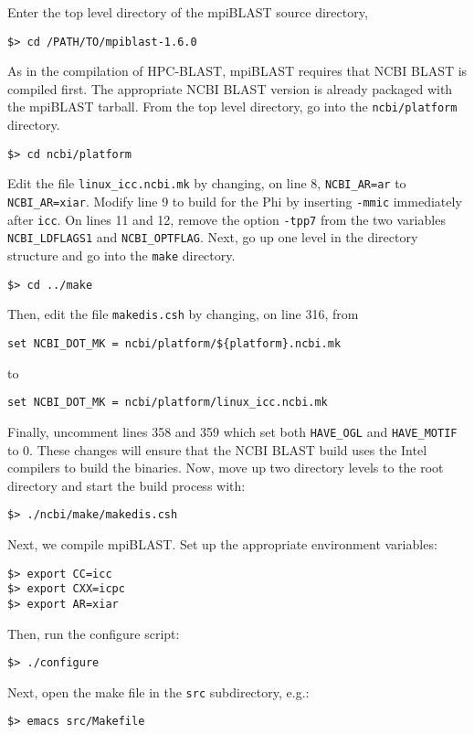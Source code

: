 \documentclass[10pt]{article}
\begin{document}
\noindent Enter the top level directory of the mpiBLAST source directory,
\begin{verbatim}
$> cd /PATH/TO/mpiblast-1.6.0
\end{verbatim}
\noindent As in the compilation of HPC-BLAST, mpiBLAST requires that NCBI BLAST is compiled first.  The appropriate NCBI BLAST version is already packaged with the mpiBLAST tarball.
From the top level directory, go into the \verb^ncbi/platform^ directory.
\begin{verbatim}
$> cd ncbi/platform
\end{verbatim}
\noindent Edit the file \verb^linux_icc.ncbi.mk^ by changing, on line 8, \verb^NCBI_AR=ar^ to \verb^NCBI_AR=xiar^.  Modify line 9 to build
for the Phi by inserting \verb^-mmic^ immediately after \verb^icc^.  On lines 11 and 12, remove the option \verb^-tpp7^ from the two variables
\verb^NCBI_LDFLAGS1^ and \verb^NCBI_OPTFLAG^.  Next, go up one level in the directory structure and go into the \verb^make^ directory.
\begin{verbatim}
$> cd ../make
\end{verbatim}
\noindent Then, edit the file \verb^makedis.csh^ by changing, on line 316, from
\begin{verbatim}
set NCBI_DOT_MK = ncbi/platform/${platform}.ncbi.mk
\end{verbatim}
\noindent to
\begin{verbatim}
set NCBI_DOT_MK = ncbi/platform/linux_icc.ncbi.mk
\end{verbatim}
\noindent Finally, uncomment lines 358 and 359 which set both \verb^HAVE_OGL^ and \verb^HAVE_MOTIF^ to 0.
These changes will ensure that the NCBI BLAST build uses the Intel compilers to build the binaries.  Now, move up two directory levels to the root directory and start the build process with:
\begin{verbatim}
$> ./ncbi/make/makedis.csh
\end{verbatim}
\noindent Next, we compile mpiBLAST.  Set up the appropriate environment variables:
\begin{verbatim}
$> export CC=icc
$> export CXX=icpc
$> export AR=xiar
\end{verbatim}
\noindent Then, run the configure script:
\begin{verbatim}
$> ./configure
\end{verbatim}
\noindent Next, open the make file in the \verb^src^ subdirectory, e.g.:
\begin{verbatim}
$> emacs src/Makefile
\end{verbatim}
\end{document}
